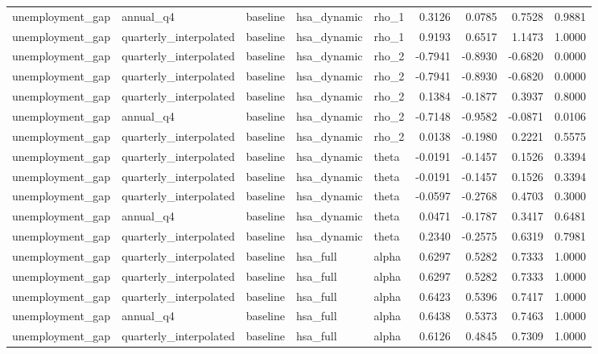 \begin{tabular}{lllllrrrr}
unemployment\_gap & annual\_q4 & baseline & hsa\_dynamic & rho\_1 & 0.3126 & 0.0785 & 0.7528 & 0.9881 \\
unemployment\_gap & quarterly\_interpolated & baseline & hsa\_dynamic & rho\_1 & 0.9193 & 0.6517 & 1.1473 & 1.0000 \\
unemployment\_gap & quarterly\_interpolated & baseline & hsa\_dynamic & rho\_2 & -0.7941 & -0.8930 & -0.6820 & 0.0000 \\
unemployment\_gap & quarterly\_interpolated & baseline & hsa\_dynamic & rho\_2 & -0.7941 & -0.8930 & -0.6820 & 0.0000 \\
unemployment\_gap & quarterly\_interpolated & baseline & hsa\_dynamic & rho\_2 & 0.1384 & -0.1877 & 0.3937 & 0.8000 \\
unemployment\_gap & annual\_q4 & baseline & hsa\_dynamic & rho\_2 & -0.7148 & -0.9582 & -0.0871 & 0.0106 \\
unemployment\_gap & quarterly\_interpolated & baseline & hsa\_dynamic & rho\_2 & 0.0138 & -0.1980 & 0.2221 & 0.5575 \\
unemployment\_gap & quarterly\_interpolated & baseline & hsa\_dynamic & theta & -0.0191 & -0.1457 & 0.1526 & 0.3394 \\
unemployment\_gap & quarterly\_interpolated & baseline & hsa\_dynamic & theta & -0.0191 & -0.1457 & 0.1526 & 0.3394 \\
unemployment\_gap & quarterly\_interpolated & baseline & hsa\_dynamic & theta & -0.0597 & -0.2768 & 0.4703 & 0.3000 \\
unemployment\_gap & annual\_q4 & baseline & hsa\_dynamic & theta & 0.0471 & -0.1787 & 0.3417 & 0.6481 \\
unemployment\_gap & quarterly\_interpolated & baseline & hsa\_dynamic & theta & 0.2340 & -0.2575 & 0.6319 & 0.7981 \\
unemployment\_gap & quarterly\_interpolated & baseline & hsa\_full & alpha & 0.6297 & 0.5282 & 0.7333 & 1.0000 \\
unemployment\_gap & quarterly\_interpolated & baseline & hsa\_full & alpha & 0.6297 & 0.5282 & 0.7333 & 1.0000 \\
unemployment\_gap & quarterly\_interpolated & baseline & hsa\_full & alpha & 0.6423 & 0.5396 & 0.7417 & 1.0000 \\
unemployment\_gap & annual\_q4 & baseline & hsa\_full & alpha & 0.6438 & 0.5373 & 0.7463 & 1.0000 \\
unemployment\_gap & quarterly\_interpolated & baseline & hsa\_full & alpha & 0.6126 & 0.4845 & 0.7309 & 1.0000 \\

\end{tabular}
